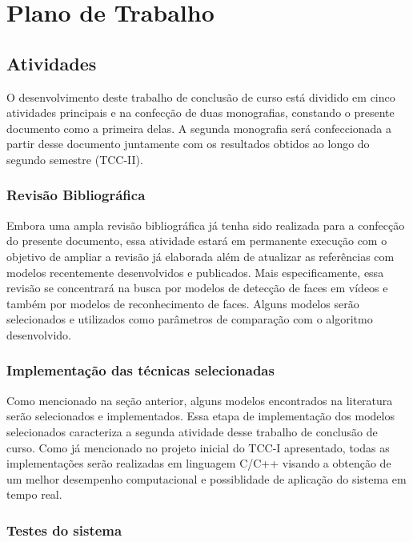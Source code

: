 \chapter{Plano de Trabalho}
\label{cap:plano}

\section{Atividades}


O desenvolvimento deste trabalho de conclusão de curso está dividido em cinco atividades principais e na confecção de duas monografias, constando o presente documento como a primeira delas. A segunda monografia será confeccionada a partir desse documento juntamente com os resultados obtidos ao longo do segundo semestre (TCC-II).

\subsection{Revisão Bibliográfica}

Embora uma ampla revisão bibliográfica já tenha sido realizada para a confecção do presente documento, essa atividade estará em permanente execução com o objetivo de ampliar a revisão já elaborada além de atualizar as referências com modelos recentemente desenvolvidos e publicados. Mais especificamente, essa revisão se concentrará na busca por modelos de detecção de faces em vídeos e também por modelos de reconhecimento de faces. Alguns modelos serão selecionados e utilizados como parâmetros de comparação com o algoritmo desenvolvido.

\subsection{Implementação das técnicas selecionadas}

Como mencionado na seção anterior, alguns modelos encontrados na literatura serão selecionados e implementados. Essa etapa de implementação dos modelos selecionados caracteriza a segunda atividade desse trabalho de conclusão de curso. Como já mencionado no projeto inicial do TCC-I apresentado, todas as implementações serão realizadas em linguagem C/C++ visando a obtenção de um melhor desempenho computacional e possiblidade de aplicação do sistema em tempo real.

\subsection{Testes do sistema}

